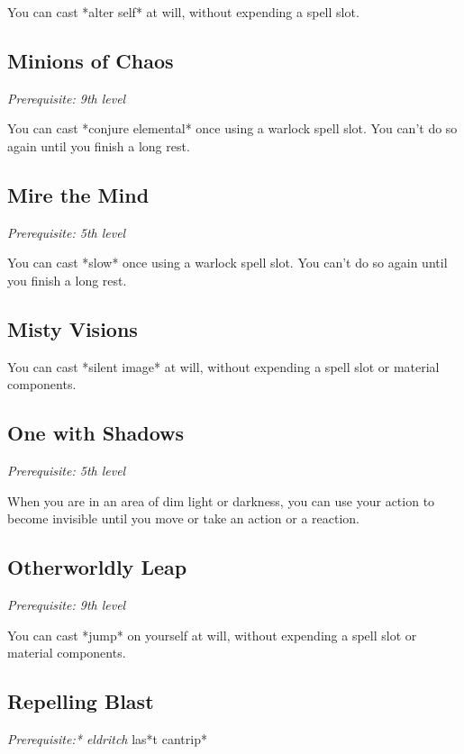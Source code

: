 You can cast *alter self* at will, without expending a spell slot.

\subsection{Minions of Chaos}

\textit{Prerequisite: 9th level}

You can cast *conjure elemental* once using a warlock spell slot. You can’t do so again until you finish a long rest.

\subsection{Mire the Mind}

\textit{Prerequisite: 5th level}

You can cast *slow* once using a warlock spell slot. You can’t do so again until you finish a long rest.

\subsection{Misty Visions}

You can cast *silent image* at will, without expending a spell slot or material components.

\subsection{One with Shadows}

\textit{Prerequisite: 5th level}

When you are in an area of dim light or darkness, you can use your action to become invisible until you move or take an action or a reaction.

\subsection{Otherworldly Leap}

\textit{Prerequisite: 9th level}

You can cast *jump* on yourself at will, without expending a spell slot or material components.

\subsection{Repelling Blast}

\textit{Prerequisite:* eldritch }las*t cantrip*

